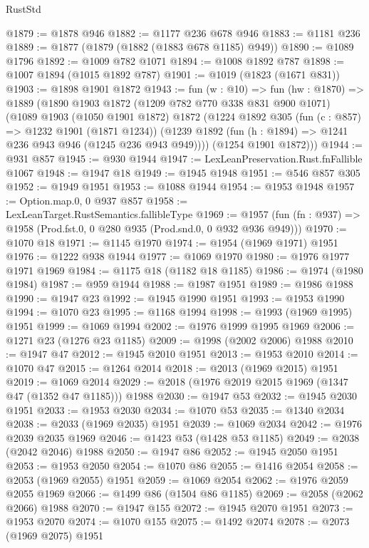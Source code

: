 \begin{lexlean}{RustStd}
\begin{coremodule}
@1879 := @1878 @946
@1882 := @1177 @236 @678 @946
@1883 := @1181 @236
@1889 := @1877 (@1879 (@1882 (@1883 @678 @1185) @949))
@1890 := @1089 @1796
@1892 := @1009 @782 @1071
@1894 := @1008 @1892 @787
@1898 := @1007 @1894 (@1015 @1892 @787)
@1901 := @1019 (@1823 (@1671 @831))
@1903 := @1898 @1901 @1872
@1943 := fun (w : @10) =>
  fun (hw : @1870) =>
  @1889
    (@1890
      @1903
      @1872
      (@1209 @782 @770 @338 @831 @900 @1071)
      (@1089
        @1903
        (@1050 @1901 @1872)
        @1872
        (@1224
          @1892
          @305
          (fun (c : @857) => @1232 @1901 (@1871 @1234))
          (@1239 @1892 (fun (h : @1894) => @1241 @236 @943 @946 (@1245 @236 @943 @949))))
        (@1254 @1901 @1872)))
@1944 := @931 @857
@1945 := @930 @1944
@1947 := LexLeanPreservation.Rust.fnFallible @1067
@1948 := @1947 @18
@1949 := @1945 @1948
@1951 := @546 @857 @305
@1952 := @1949 @1951
@1953 := @1088 @1944
@1954 := @1953 @1948
@1957 := Option.map.{0, 0} @937 @857
@1958 := LexLeanTarget.RustSemantics.fallibleType
@1969 := @1957
    (fun (fn : @937) => @1958 (Prod.fst.{0, 0} @280 @935 (Prod.snd.{0, 0} @932 @936 @949)))
@1970 := @1070 @18
@1971 := @1145 @1970
@1974 := @1954 (@1969 @1971) @1951
@1976 := @1222 @938 @1944
@1977 := @1069 @1970
@1980 := @1976 @1977 @1971 @1969
@1984 := @1175 @18 (@1182 @18 @1185)
@1986 := @1974 (@1980 @1984)
@1987 := @959 @1944
@1988 := @1987 @1951
@1989 := @1986 @1988
@1990 := @1947 @23
@1992 := @1945 @1990 @1951
@1993 := @1953 @1990
@1994 := @1070 @23
@1995 := @1168 @1994
@1998 := @1993 (@1969 @1995) @1951
@1999 := @1069 @1994
@2002 := @1976 @1999 @1995 @1969
@2006 := @1271 @23 (@1276 @23 @1185)
@2009 := @1998 (@2002 @2006) @1988
@2010 := @1947 @47
@2012 := @1945 @2010 @1951
@2013 := @1953 @2010
@2014 := @1070 @47
@2015 := @1264 @2014
@2018 := @2013 (@1969 @2015) @1951
@2019 := @1069 @2014
@2029 := @2018 (@1976 @2019 @2015 @1969 (@1347 @47 (@1352 @47 @1185))) @1988
@2030 := @1947 @53
@2032 := @1945 @2030 @1951
@2033 := @1953 @2030
@2034 := @1070 @53
@2035 := @1340 @2034
@2038 := @2033 (@1969 @2035) @1951
@2039 := @1069 @2034
@2042 := @1976 @2039 @2035 @1969
@2046 := @1423 @53 (@1428 @53 @1185)
@2049 := @2038 (@2042 @2046) @1988
@2050 := @1947 @86
@2052 := @1945 @2050 @1951
@2053 := @1953 @2050
@2054 := @1070 @86
@2055 := @1416 @2054
@2058 := @2053 (@1969 @2055) @1951
@2059 := @1069 @2054
@2062 := @1976 @2059 @2055 @1969
@2066 := @1499 @86 (@1504 @86 @1185)
@2069 := @2058 (@2062 @2066) @1988
@2070 := @1947 @155
@2072 := @1945 @2070 @1951
@2073 := @1953 @2070
@2074 := @1070 @155
@2075 := @1492 @2074
@2078 := @2073 (@1969 @2075) @1951

\end{coremodule}
\end{lexlean}
